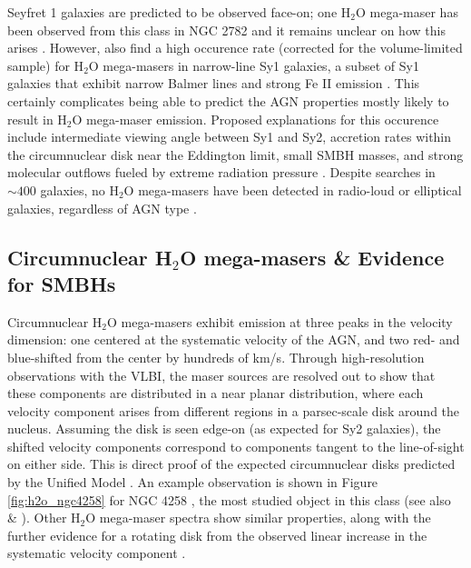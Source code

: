 Seyfret 1 galaxies are predicted to be observed face-on; one H$_2$O mega-maser has been observed from this class in NGC 2782 and it remains unclear on how this arises \citep{Tarchi_2011}. However, \citet{Tarchi_2011} also find a high occurence rate (corrected for the volume-limited sample) for H$_2$O mega-masers in narrow-line Sy1 galaxies, a subset of Sy1 galaxies that exhibit narrow Balmer lines and strong Fe II emission \citep{tarchi2012}. This certainly complicates being able to predict the AGN properties mostly likely to result in H$_2$O mega-maser emission. Proposed explanations for this occurence include intermediate viewing angle between Sy1 and Sy2, accretion rates within the circumnuclear disk near the Eddington limit, small SMBH masses, and strong molecular outflows fueled by extreme radiation pressure \citep{tarchi2012}. Despite searches in $\sim 400$ galaxies, no H$_2$O mega-masers have been detected in radio-loud or elliptical galaxies, regardless of AGN type \citep{tarchi2012}. 


\subsection{Circumnuclear H$_2$O mega-masers \& Evidence for SMBHs}
\label{sub:h20_agn}

Circumnuclear H$_2$O mega-masers exhibit emission at three peaks in the velocity dimension: one centered at the systematic velocity of the AGN, and two red- and blue-shifted from the center by hundreds of km/s. Through high-resolution observations with the VLBI, the maser sources are resolved out to show that these components are distributed in a near planar distribution, where each velocity component arises from different regions in a parsec-scale disk around the nucleus. Assuming the disk is seen edge-on (as expected for Sy2 galaxies), the shifted velocity components correspond to components tangent to the line-of-sight on either side. This is direct proof of the expected circumnuclear disks predicted by the Unified Model \citep{lo2005}. An example observation is shown in Figure \ref{fig:h2o_ngc4258} for NGC 4258 \citep{Bragg_2000}, the most studied object in this class (see also \citet{Miyoshi_1994} \& \citet{Herrnstein_1999}). Other H$_2$O mega-maser spectra show similar properties, along with the further evidence for a rotating disk from the observed linear increase in the systematic velocity component \citep{lo2005}.  

